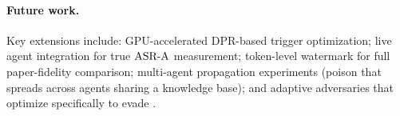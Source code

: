 \paragraph{Future work.}
Key extensions include: GPU-accelerated DPR-based trigger optimization;
live agent integration for true $\text{ASR-A}$ measurement; token-level watermark
for full paper-fidelity comparison; multi-agent propagation experiments
(poison that spreads across agents sharing a knowledge base); and
adaptive adversaries that optimize specifically to evade \sad{}.
